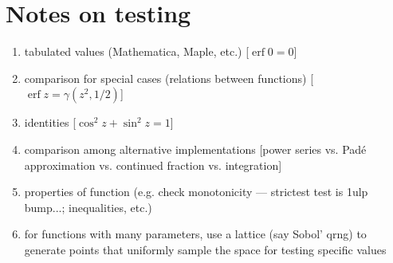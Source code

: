 \documentclass[10pt,dvipdfmx,letterpaper,twoside]{article}
\DeclareMathOperator{\erf}{erf}
\begin{document}
\section{Notes on testing}
\begin{enumerate}
\item tabulated values (Mathematica, Maple, etc.) [$\erf 0=0$]
\item comparison for special cases (relations between functions) [$\erf z=\gamma(z^2,1/2)$]
\item identities [$\cos^2z+\sin^2z=1$]
\item comparison among alternative implementations [power series vs. Pad\'e approximation vs. continued fraction vs. integration]
\item properties of function (e.g. check monotonicity --- strictest test is 1ulp bump...; inequalities, etc.)
\item for functions with many parameters, use a lattice (say Sobol' qrng) to generate points that uniformly sample the
  space for testing specific values
\end{enumerate}

\end{document}
